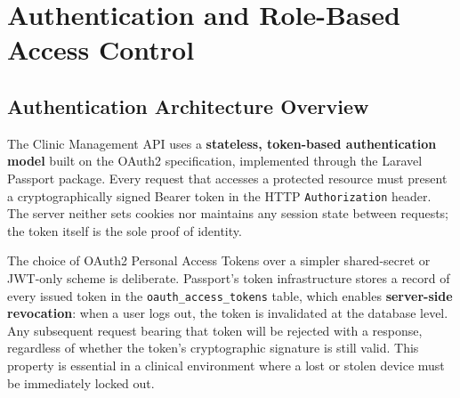 \chapter{Authentication and Role-Based Access Control}
\label{chap:auth}


\section{Authentication Architecture Overview}
\label{sec:auth-overview}

The Clinic Management API uses a \textbf{stateless, token-based
authentication model} built on the OAuth2 specification, implemented
through the Laravel Passport package. Every request that accesses a
protected resource must present a cryptographically signed Bearer token
in the HTTP \texttt{Authorization} header. The server neither sets
cookies nor maintains any session state between requests; the token
itself is the sole proof of identity.

The choice of OAuth2 Personal Access Tokens over a simpler shared-secret
or JWT-only scheme is deliberate. Passport's token infrastructure stores
a record of every issued token in the \texttt{oauth\_access\_tokens}
table, which enables \textbf{server-side revocation}: when a user logs
out, the token is invalidated at the database level. Any subsequent
request bearing that token will be rejected with a \stunauth{} response,
regardless of whether the token's cryptographic signature is still valid.
This property is essential in a clinical environment where a lost or
stolen device must be immediately locked out.

